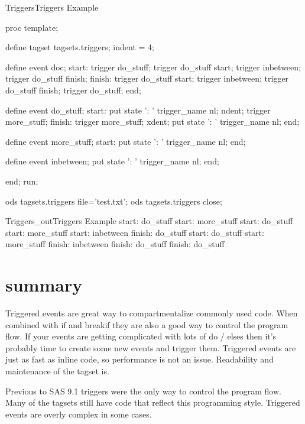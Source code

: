 \begin{fvcode}{Triggers}{Triggers Example}

proc template;

   define tagset tagsets.triggers;
       indent = 4;

       define event doc; 
          start:
              trigger do_stuff;
              trigger do_stuff start;
              trigger inbetween;
              trigger do_stuff finish;
          finish:
              trigger do_stuff start;
              trigger inbetween;
              trigger do_stuff finish;
              trigger do_stuff;
       end;

       define event do_stuff;
           start:
               put state ': ' trigger_name nl;
               ndent;
               trigger more_stuff;
           finish:
               trigger more_stuff;
               xdent;
               put state ': ' trigger_name nl;
       end;

       define event more_stuff;
           start:
               put state ': ' trigger_name nl;
       end;

       define event inbetween;
           put state ': ' trigger_name nl;
       end;

   end;
run;

ods tagsets.triggers file='test.txt';
ods tagsets.triggers close;

\end{fvcode}

\begin{fvoutput}{Triggers_out}{Triggers Example}
start: do_stuff
    start: more_stuff
    start: do_stuff
        start: more_stuff
        start: inbetween
    finish: do_stuff
    start: do_stuff
        start: more_stuff
        finish: inbetween
    finish: do_stuff
finish: do_stuff
\end{fvoutput}


\section{summary}
Triggered events are great way to compartmentalize commonly used code.  When combined
with if and breakif they are also a good way to control the program flow.  If your 
events are getting complicated with lots of do / elses then it's probably time to
create some new events and trigger them.  Triggered events are just as fast as
inline code, so performance is not an issue.  Readability and maintenance of the
tagset is.

Previous to SAS 9.1 triggers were the only way to control the program flow.   
Many of the tagsets still have code that reflect this programming style.  Triggered
events are overly complex in some cases. 



